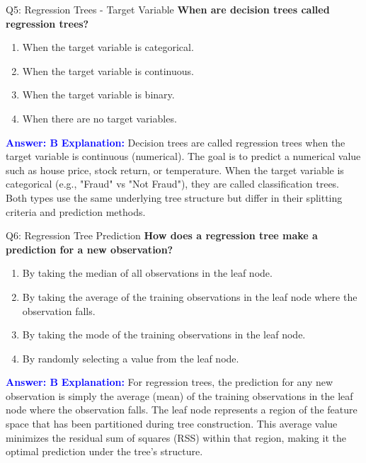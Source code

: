 \documentclass[8pt]{beamer}
\begin{document}
	\begin{frame}{Q5: Regression Trees - Target Variable}
		\fontsize{6.5}{7.5}\selectfont
		\textbf{When are decision trees called regression trees?}
		\begin{enumerate}
			\item When the target variable is categorical.
			\item When the target variable is continuous.
			\item When the target variable is binary.
			\item When there are no target variables.
		\end{enumerate}
		\vspace{0.1cm}
		\textcolor{blue}{\textbf{Answer: B}}
		\vspace{0.2cm}
		\textcolor{blue}{\textbf{Explanation:}} Decision trees are called regression trees when the target variable is continuous (numerical). The goal is to predict a numerical value such as house price, stock return, or temperature. When the target variable is categorical (e.g., "Fraud" vs "Not Fraud"), they are called classification trees. Both types use the same underlying tree structure but differ in their splitting criteria and prediction methods.
	\end{frame}
	
	\begin{frame}{Q6: Regression Tree Prediction}
		\fontsize{6.5}{7.5}\selectfont
		\textbf{How does a regression tree make a prediction for a new observation?}
		\begin{enumerate}
			\item By taking the median of all observations in the leaf node.
			\item By taking the average of the training observations in the leaf node where the observation falls.
			\item By taking the mode of the training observations in the leaf node.
			\item By randomly selecting a value from the leaf node.
		\end{enumerate}
		\vspace{0.1cm}
		\textcolor{blue}{\textbf{Answer: B}}
		\vspace{0.2cm}
		\textcolor{blue}{\textbf{Explanation:}} For regression trees, the prediction for any new observation is simply the average (mean) of the training observations in the leaf node where the observation falls. The leaf node represents a region of the feature space that has been partitioned during tree construction. This average value minimizes the residual sum of squares (RSS) within that region, making it the optimal prediction under the tree's structure.
	\end{frame}
	
\end{document}
